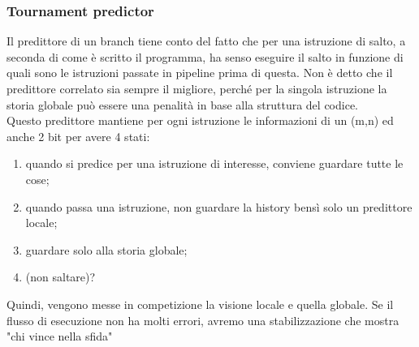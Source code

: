 \documentclass[12pt, oneside]{extbook}
\begin{document}
\subsubsection{Tournament predictor}
Il predittore di un branch tiene conto del fatto che per una istruzione di salto, a seconda di come è scritto il programma, ha senso eseguire il salto in funzione di quali sono le istruzioni passate in pipeline prima di questa. Non è detto che il predittore correlato sia sempre il migliore, perché per la singola istruzione la storia globale può essere una penalità in base alla struttura del codice.\\ Questo predittore mantiene per ogni istruzione le informazioni di un (m,n) ed anche 2 bit per avere 4 stati:
\begin{enumerate}
\item quando si predice per una istruzione di interesse, conviene guardare tutte le cose;
\item quando passa una istruzione, non guardare la history bensì solo un predittore locale;
\item guardare solo alla storia globale;
\item (non saltare)?
\end{enumerate}
Quindi, vengono messe in competizione la visione locale e quella globale. Se il flusso di esecuzione non ha molti errori, avremo una stabilizzazione che mostra "chi vince nella sfida"
\end{document}
